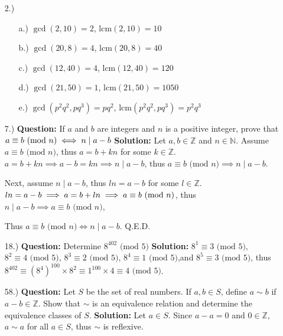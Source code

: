 \documentclass[12pt]{article}
\newcommand{\lcm}{\text{lcm}}
\newcommand{\pmd}[1]{\text{ (mod }#1\text{)}}
\begin{document}
\pagestyle{fancy}
\fancyhead{}

\normalsize

\begin{itemize}
    \item [2.)] \begin{itemize}
        \item [a.)] $\gcd(2,10)=2$, $\lcm(2,10)=10$
        \item [b.)] $\gcd(20,8)=4$, $\lcm(20,8)=40$
        \item [c.)] $\gcd(12,40)=4$, $\lcm(12,40)=120$
        \item [d.)] $\gcd(21,50)=1$, $\lcm(21,50)=1050$
        \item [e.)] $\gcd(p^2q^2,pq^3)=pq^2$, $\lcm(p^2q^2,pq^3)=p^2q^3$
    \end{itemize}

    \item [7.)] \textbf{Question:} If $a$ and $b$ are integers and $n$ is a positive integer, prove that $a\equiv b\pmd{n}\break\iff n\mid a-b$\newline
    \textbf{Solution:} Let $a,b\in\mathbb{Z}$ and $n\in\mathbb{N}$. Assume $a\equiv b\pmd{n}$, thus $a=b+kn$ for some $k\in\mathbb{Z}$. $a=b+kn\implies a-b=kn\implies n\mid a-b$, thus $a\equiv b\pmd{n}\implies n\mid a-b$.
    
    Next, assume $n\mid a-b$, thus $ln=a-b$ for some $l\in\mathbb{Z}$. $ln=a-b\implies a=b+ln\break\implies a\equiv b\pmd{n}$, thus $n\mid a-b\implies a\equiv b\pmd{n}$,
    
    Thus $a\equiv b\pmd{n}\iff n\mid a-b$. Q.E.D.

    \item [18.)] \textbf{Question:} Determine $8^{402}\pmd{5}$\newline
    \textbf{Solution:} $8^1\equiv3\pmd{5}$, $8^2\equiv4\pmd{5}$, $8^3\equiv2\pmd{5}$, $8^4\equiv1\pmd{5}$,\break and $8^5\equiv3\pmd{5}$, thus $8^{402}\equiv(8^4)^{100}\times8^2\equiv1^{100}\times4\equiv4\pmd{5}$.
    
    \item [58.)] \textbf{Question:} Let $S$ be the set of real numbers. If $a,b\in S$, define $a\sim b$ if $a-b\in\mathbb{Z}$. Show that $\sim$ is an equivalence relation and determine the equivalence classes of $S$.\newline
    \textbf{Solution:} Let $a\in S$. Since $a-a=0$ and $0\in\mathbb{Z}$, $a\sim a$ for all $a\in S$, thus $\sim$ is reflexive.


\end{itemize}
\end{document}
